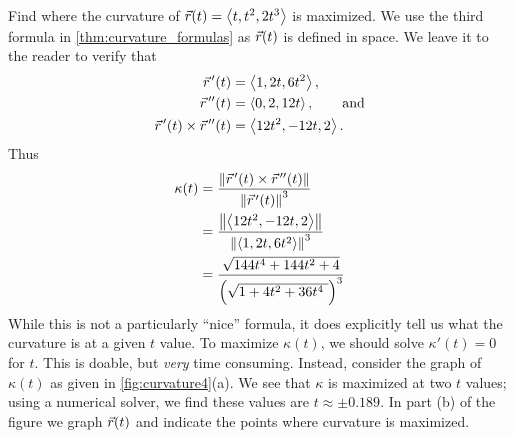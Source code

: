 \begin{example}\label{ex_curvature4}%
Find where the curvature of $\vec r(t) =\left\langle t, t^2, 2t^3\right\rangle$ is maximized.
\solution
We use the third formula in \autoref{thm:curvature_formulas} as $\vec r(t)$ is defined in space. We leave it to the reader to verify that 
\begin{align*}
 \vec r\hskip1.25pt '(t) &=\left\langle 1,2t,6t^2\right\rangle,\\
 \vec r\hskip1.25pt ''(t) &=\left\langle 0,2,12t\right\rangle,\qquad \text{and}\\
 \vec r\hskip1.25pt '(t)\times \vec r\hskip1.25pt ''(t) &=\left\langle 12t^2,-12t,2\right\rangle.
\end{align*}
Thus 
\begin{align*}
\kappa(t) &= \frac{\norm{\vrp(t)\times\vrp'(t)}}{\norm{\vrp(t)}^3} \\
	&= \frac{\norm{\bracket{12t^2,-12t,2}}}{\norm{\bracket{1,2t,6t^2}}^3} \smallskip\\
	&= \frac{\sqrt{144t^4+144t^2+4}}{\Bigl(\sqrt{1+4t^2+36t^4\ }\Bigr)^3}
\end{align*}
While this is not a particularly ``nice'' formula, it does explicitly tell us what the curvature is at a given $t$ value. To maximize $\kappa(t)$, we should solve $\kappa'(t)=0$ for $t$. This is doable, but \emph{very} time consuming. Instead, consider the graph of $\kappa(t)$ as given in \autoref{fig:curvature4}(a). We see that $\kappa$ is maximized at two $t$ values; using a numerical solver, we find these values are $t\approx\pm 0.189$. In part (b) of the figure we graph $\vec r(t)$ and indicate the points where curvature is maximized.
\end{example}

%

